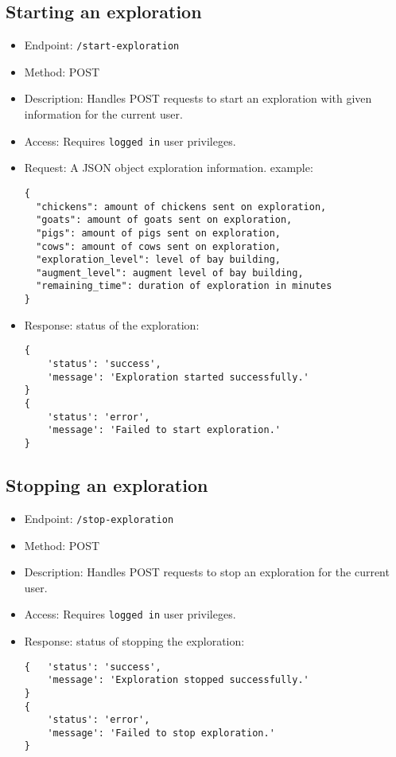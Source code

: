 \documentclass[12pt]{article}
\begin{document}
\subsection{Starting an exploration}
\begin{itemize}
    \item Endpoint: \texttt{/start-exploration}
    \item Method: POST
    \item {Description:} Handles POST requests to start an exploration with given information for the current user.
    \item {Access:} Requires \texttt{logged in} user privileges.
    \item {Request:} A JSON object exploration information. example:
    \begin{verbatim}
{
  "chickens": amount of chickens sent on exploration,
  "goats": amount of goats sent on exploration,
  "pigs": amount of pigs sent on exploration,
  "cows": amount of cows sent on exploration,
  "exploration_level": level of bay building,
  "augment_level": augment level of bay building,
  "remaining_time": duration of exploration in minutes
}
    \end{verbatim}
    \item {Response:} status of the exploration:
    \begin{verbatim}
{
    'status': 'success',
    'message': 'Exploration started successfully.'
}
{
    'status': 'error',
    'message': 'Failed to start exploration.'
}
    \end{verbatim}
\end{itemize}

\subsection{Stopping an exploration}
\begin{itemize}
    \item Endpoint: \texttt{/stop-exploration}
    \item Method: POST
    \item {Description:} Handles POST requests to stop an exploration for the current user.
    \item {Access:} Requires \texttt{logged in} user privileges.
    \item {Response:} status of stopping the exploration:
    \begin{verbatim}
{   'status': 'success',
    'message': 'Exploration stopped successfully.'
}
{
    'status': 'error',
    'message': 'Failed to stop exploration.'
}
    \end{verbatim}
\end{itemize}
\end{document}
